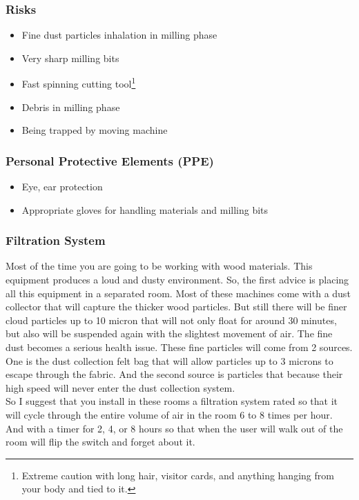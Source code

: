 \documentclass[a4paper,12pt,titlepage]{article}
\begin{document}
\subsubsection*{Risks}
\begin{itemize}
\item Fine dust particles inhalation in milling phase
\item Very sharp milling bits
\item Fast spinning cutting tool\footnote{Extreme caution with long hair, visitor cards, and anything hanging from your body and tied to it.}
\item Debris in milling phase
\item Being trapped by moving machine
\end{itemize}
\subsubsection*{Personal Protective Elements (PPE)}
\begin{itemize}
\item Eye, ear protection
\item Appropriate gloves for handling materials and milling bits
\end{itemize}

\subsubsection*{Filtration System}
Most of the time you are going to be working with wood materials. This equipment
produces a loud and dusty environment. So, the first advice is
placing all this equipment in a separated room. Most of these machines come with
a dust collector that will capture the thicker wood particles. But still there will be finer cloud
particles up to 10 micron that will not only float for around 30 minutes, but also will be
suspended again with the slightest movement of air. The fine dust becomes a serious health issue. These
fine particles will come from 2 sources. One is the dust collection felt bag that will allow
particles up to 3 microns to escape through the fabric. And the second source is particles that because their high speed will never enter the dust collection system.\\

So I suggest that you install in these rooms a filtration system rated so that it will cycle through
the entire volume of air in the room 6 to 8 times per hour. And with a timer for 2, 4, or 8 hours
so that when the user will walk out of the room will flip the switch and forget about it.
\end{document}
